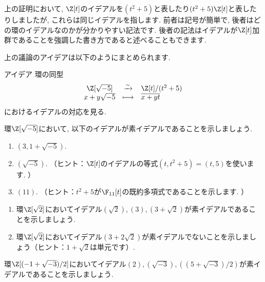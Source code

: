 \documentclass[11pt,b5paper,oneside,titlepage,lualatex]{ltjsreport}
\numberwithin{equation}{section} %
\begin{document}
\begin{rem}{}{}
	上の証明において, $ \Z[t] $のイデアルを$ (t^2 + 5) $と表したり$ (t^2 + 5) \Z[t] $と表したりしましたが, これらは同じイデアルを指します. 
	前者は記号が簡単で, 後者はどの環のイデアルなのかが分かりやすい記法です. 
	後者の記法はイデアルが$ \Z[t] $加群であることを強調した書き方であると述べることもできます. 
\end{rem}

上の議論のアイデアは以下のようにまとめられます. 

\begin{simplebox}{アイデア}
	環の同型
	\[
	\begin{array}{ccl}
		\Z[\sqrt{-5}] & \xrightarrow{\sim} & \Z[t]/(t^2 + 5) \\
		x + y\sqrt{-5} & \longmapsto & \overline{x + yt}
	\end{array}
	\]
	におけるイデアルの対応を見る. 
\end{simplebox}

\begin{exc}{}{}
	環$ \Z[\sqrt{-5}] $において, 以下のイデアルが素イデアルであることを示しましょう. 
	\begin{enumerate}
		\item $ (3, 1 + \sqrt{-5}) $.
		\item $ (\sqrt{-5}) $. （ヒント：$ \Z[t] $のイデアルの等式$ (t, t^2+5) = (t, 5) $を使います. ）
		\item $ (11) $. （ヒント：$ t^2+5 $が$ \F_{11}[t] $の既約多項式であることを示します. ）
	\end{enumerate}
\end{exc}

\begin{exc}{}{}
	\begin{enumerate}
		\item 環$ \Z[\sqrt{2}] $においてイデアル$ (\sqrt{2}), (3), (3+\sqrt{2}) $が素イデアルであることを示しましょう. 
		\item 環$ \Z[\sqrt{2}] $においてイデアル$ (3+2\sqrt{2}) $が素イデアルでないことを示しましょう（ヒント：$ 1 + \sqrt{2} $は単元です）. 
	\end{enumerate}
\end{exc}

\begin{exc}{}{}
	環$ \Z[(-1 + \sqrt{-3})/2] $においてイデアル$ (2), (\sqrt{-3}), ((5 + \sqrt{-3})/2) $が素イデアルであることを示しましょう. 
\end{exc}

\end{document}
